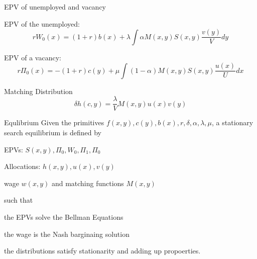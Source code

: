 \documentclass{beamer}%
\begin{document}
\begin{frame}{EPV of unemployed and vacancy}
\begin{widei}
\item EPV of the unemployed:
\begin{equation*}
rW_0(x) = (1+r)b(x) + \lambda \int \alpha M(x,y) S(x,y) \frac{v(y)}{V}dy
\end{equation*}
\item EPV of a vacancy:
\begin{equation*}
r\Pi_0(x) = -(1+r)c(y) + \mu \int (1-\alpha) M(x,y) S(x,y) \frac{u(x)}{U}dx
\end{equation*}
\item Matching Distribution
\begin{equation*}
\delta h(c,y) = \frac{\lambda}{V}M(x,y)u(x)v(y)
\end{equation*}
\end{widei}
\end{frame}

\begin{frame}{Equlibrium}
Given the primitives $f(x,y),c(y),b(x),r,\delta,\alpha, \lambda,\mu$, a stationary search equilibrium is defined by
\begin{midi}
\item EPVs: $S(x,y),\Pi_0,W_0,\Pi_1,\Pi_0$
\item Allocations: $h(x,y),u(x),v(y)$
\item wage $w(x,y)$ and matching functions $M(x,y)$
\end{midi}
such that
\begin{mide}
\item the EPVs solve the Bellman Equations
\item the wage is the Nash barginaing solution
\item the distributions satisfy stationarity and adding up propoerties.
\end{mide}
\end{frame}
\end{document}

